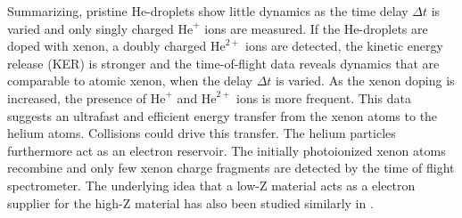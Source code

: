Summarizing, pristine He-droplets show little dynamics as the time delay $\Delta t$ is varied and only singly charged $\text{He}^{+}$ ions are measured. If the He-droplets are doped with xenon, a doubly charged $\text{He}^{2+}$ ions are detected, the kinetic energy release (KER) is stronger and the time-of-flight data reveals dynamics that are comparable to atomic xenon, when the delay $\Delta t$ is varied. As the xenon doping is increased, the presence of $\text{He}^{+}$ and $\text{He}^{2+}$ ions is more frequent. This data suggests an ultrafast and efficient energy transfer from the xenon atoms to the helium atoms. Collisions could drive this transfer. The helium particles furthermore act as an electron reservoir. The initially photoionized xenon atoms recombine and only few xenon charge fragments are detected by the time of flight spectrometer. The underlying idea that a low-Z material acts as a electron supplier for the high-Z material has also been studied similarly in \citep{Hoener-2008-JPB}.
%
%
%
